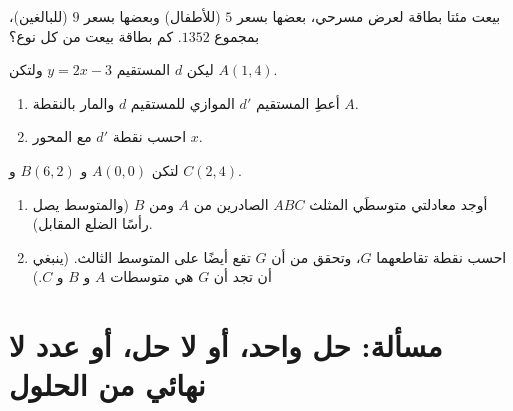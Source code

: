 \begin{exercise}[$\star\star$]\label{exo:g10:lines:8}
بيعت مئتا بطاقة لعرض مسرحي، بعضها بسعر $5$ (للأطفال)
وبعضها بسعر $9$ (للبالغين)، بمجموع $1352$. كم بطاقة بيعت من كل
نوع؟
\end{exercise}

\begin{exercise}[$\star\star$]\label{exo:g10:lines:9}
ليكن $d$ المستقيم $y = 2x - 3$ ولتكن $A(1, 4)$.
\begin{enumerate}
  \item أعطِ  المستقيم $d'$ الموازي للمستقيم $d$ والمار
        بالنقطة $A$.
  \item احسب نقطة  $d'$ مع المحور $x$.
\end{enumerate}
\end{exercise}

\begin{exercise}[$\star\star\star$]\label{exo:g10:lines:10}
لتكن $A(0, 0)$ و $B(6, 2)$ و $C(2, 4)$.
\begin{enumerate}
  \item أوجد معادلتي متوسطَي المثلث $ABC$ الصادرين
        من $A$ ومن $B$ (والمتوسط يصل رأسًا 
        الضلع المقابل).
  \item احسب نقطة تقاطعهما $G$، وتحقق من أن
        $G$ تقع أيضًا على المتوسط الثالث. (ينبغي أن تجد أن
         $G$ هي متوسطات  $A$ و $B$ و $C$.)
\end{enumerate}
\end{exercise}

\section{مسألة: حل واحد، أو لا حل، أو عدد لا نهائي من الحلول}

